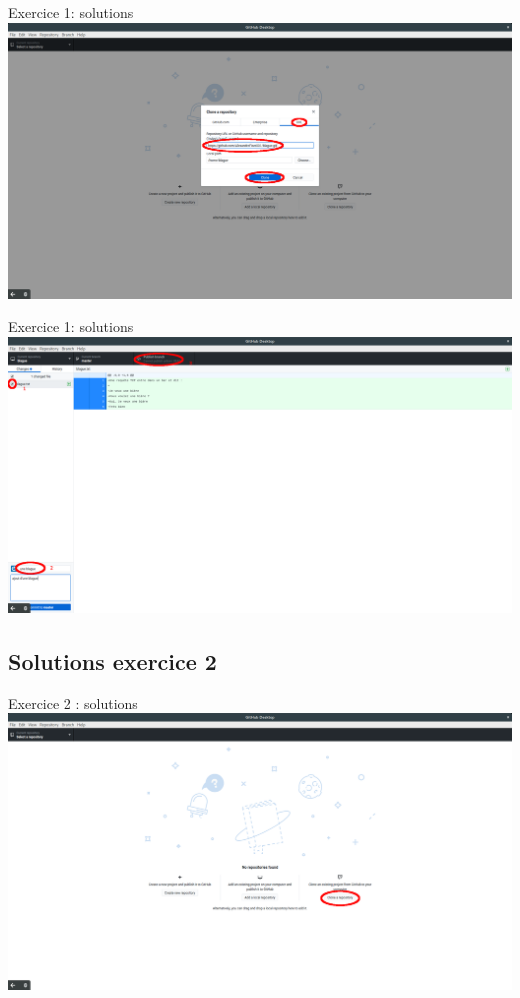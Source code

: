 \documentclass{beamer}
\begin{document}
\begin{frame}{Exercice 1: solutions}
    \centering
    \includegraphics[width=\textwidth]{img/image_exercices/cloning_with_url.png}
\end{frame}

\begin{frame}{Exercice 1: solutions}
    \centering
    \includegraphics[width=\textwidth]{img/image_exercices/add+commit+push_1.png}
\end{frame}

\subsection{Solutions exercice 2}

\begin{frame}{Exercice 2 : solutions}
    \centering
    \includegraphics[width=\textwidth]{img/image_exercices/clonning_repo.png}
\end{frame}
\end{document}

